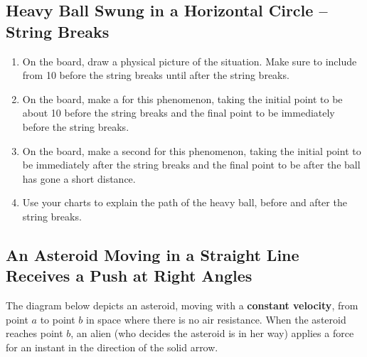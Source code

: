 \subsection{Heavy Ball Swung in a Horizontal Circle -- String Breaks}
\label{act7.2.2}

\label{act7.2.2-1}
\begin{fnt}
	
\end{fnt}
\begin{enumerate}
	\item On the board, draw a physical picture of the situation. Make sure to include from 10\textdegree{} before the string breaks until after the string breaks.
	\item On the board, make a \pchart{} for this phenomenon, taking the initial point to be about 10\textdegree{} before the string breaks and the final point to be immediately before the string breaks.
	\item On the board, make a second \pchart{} for this phenomenon, taking the initial point to be immediately after the string breaks and the final point to be after the ball has gone a short distance.
	\item Use your charts to explain the path of the heavy ball, before and after the string breaks.
\end{enumerate}
\WCD

\newpage
\subsection{An Asteroid Moving in a Straight Line Receives a Push at Right Angles}
\label{act7.2.2-2}

The diagram below depicts an asteroid, moving with a \textbf{constant velocity}, from point $a$ to point $b$ in space where there is no air resistance. When the asteroid reaches point $b$, an alien (who decides the asteroid is in her way) applies a force for an instant in the direction of the solid arrow. 

\begin{center}
\end{center}

